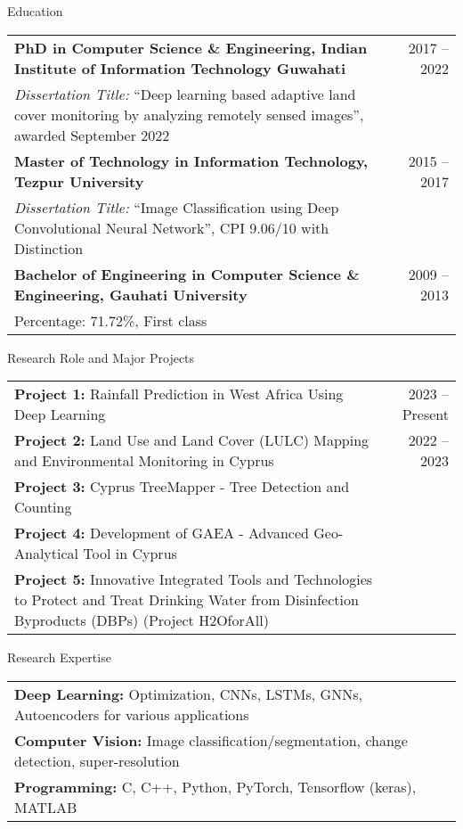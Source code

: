 \documentclass{resume} %
\begin{document}
\vspace{-5px}
\begin{rSection}{Education}
		\vspace{-4px}
\begin{tabular}{p{\dimexpr\textwidth-4cm}r}
	\textbf{PhD in Computer Science \& Engineering, Indian Institute of Information Technology Guwahati} & 2017 -- 2022 \\
	\textit{Dissertation Title:} “Deep learning based adaptive land cover monitoring by analyzing remotely sensed images”, awarded September 2022 & \\
	\textbf{Master of Technology in Information Technology, Tezpur University} & 2015 -- 2017 \\
	\textit{Dissertation Title:} “Image Classification using Deep Convolutional Neural Network”, CPI 9.06/10 with Distinction & \\
	\textbf{Bachelor of Engineering in Computer Science \& Engineering, Gauhati University} & 2009 -- 2013 \\
	Percentage: 71.72\%, First class & \\
\end{tabular}
\end{rSection}

\vspace{-5px}
\begin{rSection}{Research Role and Major Projects}
	\vspace{-4px}
\begin{tabular}{p{\dimexpr\textwidth-4cm}r}
	\textbf{Project 1:} Rainfall Prediction in West Africa Using Deep Learning & 2023 -- Present \\
	\textbf{Project 2:} Land Use and Land Cover (LULC) Mapping and Environmental Monitoring in Cyprus & 2022 -- 2023 \\
	\textbf{Project 3:} Cyprus TreeMapper - Tree Detection and Counting & \\
	\textbf{Project 4:} Development of GAEA - Advanced Geo-Analytical Tool in Cyprus & \\
	\textbf{Project 5:} Innovative Integrated Tools and Technologies to Protect and Treat Drinking Water from Disinfection Byproducts (DBPs) (Project H2OforAll) & \\
\end{tabular}
\end{rSection}
\vspace{-5px}
\begin{rSection}{Research Expertise}	
		\vspace{-4px}
	\begin{tabular}{p{18cm}}
		\textbf{Deep Learning:} Optimization, CNNs, LSTMs, GNNs, Autoencoders for various applications \\
		\textbf{Computer Vision:} Image classification/segmentation, change detection, super-resolution \\
		\textbf{Programming: } C, C++, Python, PyTorch, Tensorflow (keras), MATLAB \\		
	\end{tabular}
\vspace{-5px}	
\end{rSection}
\end{document}
